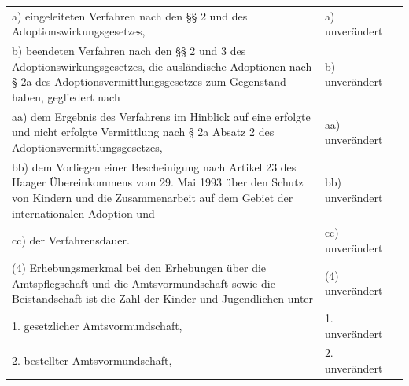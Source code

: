 \documentclass[10pt,a4paper,landscape]{article}
\begin{document}
\begin{longtable}{|L{8.2cm}|L{8.2cm}|L{8.2cm}|}
\hhline{|---|}
a)   \newline eingeleiteten Verfahren nach den \S{}\S{} 2 und   des Adoptionswirkungsgesetzes, & a) unverändert &  \\
\hhline{|---|}
b)   \newline beendeten Verfahren nach den \S{}\S{} 2 und 3  \newline des Adoptionswirkungsgesetzes, die  \newline ausländische Adoptionen nach \S{} 2a des  \newline Adoptionsvermittlungsgesetzes zum  \newline Gegenstand haben, gegliedert nach & b) unverändert &  \\
\hhline{|---|}
aa)   \newline dem Ergebnis des Verfahrens im Hinblick  \newline auf eine erfolgte und nicht erfolgte  \newline Vermittlung nach \S{} 2a Absatz 2 des  \newline Adoptionsvermittlungsgesetzes, & aa) unverändert &  \\
\hhline{|---|}
bb)   \newline dem Vorliegen einer Bescheinigung nach  \newline Artikel 23 des Haager Übereinkommens  \newline vom 29. Mai 1993 über den Schutz von  \newline Kindern und die Zusammenarbeit auf dem  \newline Gebiet der internationalen Adoption und & bb) unverändert &  \\
\hhline{|---|}
cc)   \newline der Verfahrensdauer. & cc) unverändert &  \\
\hhline{|---|}
(4) Erhebungsmerkmal bei den Erhebungen  \newline über die Amtspflegschaft und die  \newline Amtsvormundschaft sowie die  \newline Beistandschaft ist die Zahl der Kinder und  \newline Jugendlichen unter & (4) unverändert &  \\
\hhline{|---|}
1.   \newline gesetzlicher Amtsvormundschaft, & 1. unverändert &  \\
\hhline{|---|}
2.   \newline bestellter Amtsvormundschaft, & 2. unverändert &  \\

\end{longtable}
\end{document}
